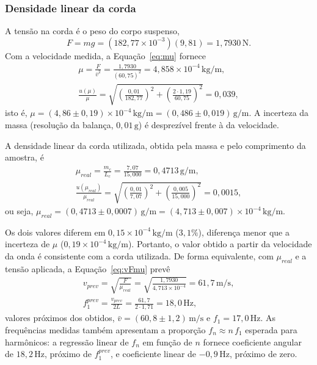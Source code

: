 \documentclass[12pt, a4paper]{article}
\newcommand{\un}[1]{\,\mathrm{#1}}
\begin{document}
\subsubsection{Densidade linear da corda}

A tensão na corda é o peso do corpo suspenso,
\[
F=mg=\left(182{,}77\times10^{-3}\right)(9{,}81)=1{,}7930\un{N}.
\]
Com a velocidade medida, a Equação~\eqref{eq:mu} fornece
\begin{gather*}
\mu=\frac{F}{\bar{v}^2}=\frac{1{,}7930}{(60{,}75)^2}=4{,}858\times10^{-4}\un{kg/m},\\
\frac{u(\mu)}{\mu}=\sqrt{\left(\frac{0{,}01}{182{,}77}\right)^2+\left(\frac{2\cdot1{,}19}{60{,}75}\right)^2}=0{,}039,
\end{gather*}
isto é, $\mu=(4{,}86\pm0{,}19)\times10^{-4}\un{kg/m}=(0{,}486\pm0{,}019)\un{g/m}$. A incerteza da massa (resolução da balança, $0{,}01\un{g}$) é desprezível frente à da velocidade.

A densidade linear da corda utilizada, obtida pela massa e pelo comprimento da amostra, é
\begin{gather*}
\mu_{real}=\frac{m_c}{L_c}=\frac{7{,}07}{15{,}000}=0{,}4713\un{g/m},\\
\frac{u(\mu_{real})}{\mu_{real}}=\sqrt{\left(\frac{0{,}01}{7{,}07}\right)^2+\left(\frac{0{,}005}{15{,}000}\right)^2}=0{,}0015,
\end{gather*}
ou seja, $\mu_{real}=(0{,}4713\pm0{,}0007)\un{g/m}=(4{,}713\pm0{,}007)\times10^{-4}\un{kg/m}$.

Os dois valores diferem em $0{,}15\times10^{-4}\un{kg/m}$ ($3{,}1\%$), diferença menor que a incerteza de $\mu$ ($0{,}19\times10^{-4}\un{kg/m}$). Portanto, o valor obtido a partir da velocidade da onda é consistente com a corda utilizada. De forma equivalente, com $\mu_{real}$ e a tensão aplicada, a Equação~\eqref{eq:vFmu} prevê
\begin{gather*}
v_{prev}=\sqrt{\frac{F}{\mu_{real}}}=\sqrt{\frac{1{,}7930}{4{,}713\times10^{-4}}}=61{,}7\un{m/s},\\
f_1^{prev}=\frac{v_{prev}}{2L}=\frac{61{,}7}{2\cdot1{,}71}=18{,}0\un{Hz},
\end{gather*}
valores próximos dos obtidos, $\bar{v}=(60{,}8\pm1{,}2)\un{m/s}$ e $f_1=17{,}0\un{Hz}$. As frequências medidas também apresentam a proporção $f_n\approx n\,f_1$ esperada para harmônicos: a regressão linear de $f_n$ em função de $n$ fornece coeficiente angular de $18{,}2\un{Hz}$, próximo de $f_1^{prev}$, e coeficiente linear de $-0{,}9\un{Hz}$, próximo de zero.
\end{document}
